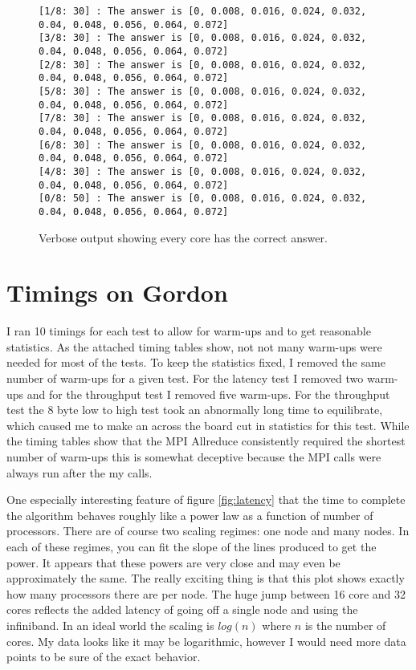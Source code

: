\documentclass[11pt,a4paper,oneside]{report}
\begin{document}
\begin{figure}[htpb]
  \texttt{[1/8:  30] : The answer is [0, 0.008, 0.016, 0.024, 0.032, 0.04, 0.048, 0.056, 0.064, 0.072]\\}
  \texttt{[3/8:  30] : The answer is [0, 0.008, 0.016, 0.024, 0.032, 0.04, 0.048, 0.056, 0.064, 0.072]\\}
  \texttt{[2/8:  30] : The answer is [0, 0.008, 0.016, 0.024, 0.032, 0.04, 0.048, 0.056, 0.064, 0.072]\\}
  \texttt{[5/8:  30] : The answer is [0, 0.008, 0.016, 0.024, 0.032, 0.04, 0.048, 0.056, 0.064, 0.072]\\}
  \texttt{[7/8:  30] : The answer is [0, 0.008, 0.016, 0.024, 0.032, 0.04, 0.048, 0.056, 0.064, 0.072]\\}
  \texttt{[6/8:  30] : The answer is [0, 0.008, 0.016, 0.024, 0.032, 0.04, 0.048, 0.056, 0.064, 0.072]\\}
  \texttt{[4/8:  30] : The answer is [0, 0.008, 0.016, 0.024, 0.032, 0.04, 0.048, 0.056, 0.064, 0.072]\\}
  \texttt{[0/8:  50] : The answer is [0, 0.008, 0.016, 0.024, 0.032, 0.04, 0.048, 0.056, 0.064, 0.072]\\}
  \caption{Verbose output showing every core has the correct answer.}
  \label{fig:matchingcores}
\end{figure}
\pagebreak
\section{Timings on Gordon}

I ran 10 timings for each test to allow for warm-ups and to get reasonable statistics.  As the attached timing tables show, not not many warm-ups were needed for most of the tests.  To keep the statistics fixed, I removed the same number of warm-ups for a given test.  For the latency test I removed two warm-ups and for the throughput test I removed five warm-ups.  For the throughput test the 8 byte low to high test took an abnormally long time to equilibrate, which caused me to make an across the board cut in statistics for this test.  While the timing tables show that the MPI Allreduce consistently required the shortest number of warm-ups this is somewhat deceptive because the MPI calls were always run after the my calls.

One especially interesting feature of figure \ref{fig:latency} that the time to complete the algorithm behaves roughly like a power law as a function of number of processors.  There are of course two scaling regimes:  one node and many nodes.  In each of these regimes, you can fit the slope of the lines produced to get the power.  It appears that these powers are very close and may even be approximately the same.  The really exciting thing is that this plot shows exactly how many processors there are per node.  The huge jump between 16 core and 32 cores reflects the added latency of going off a single node and using the infiniband.  In an ideal world the scaling is $log(n)$ where $n$ is the number of cores.  My data looks like it may be logarithmic, however I would need more data points to be sure of the exact behavior.
\end{document}
